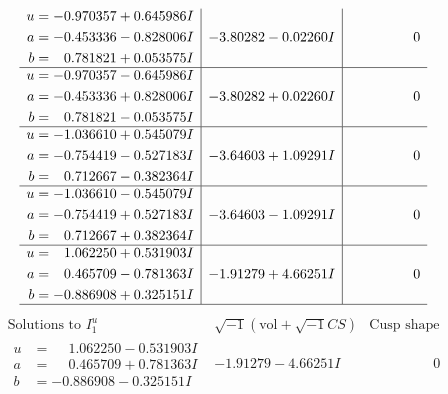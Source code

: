 \documentclass[1p]{elsarticle_modified}
\theoremstyle{definition}
\newcommand{\I}{\sqrt{-1}}
\begin{document}
$$\begin{array}{c|c|c}
\begin{aligned}
u &= -0.970357 + 0.645986 I \\
a &= -0.453336 - 0.828006 I \\
b &= \phantom{-}0.781821 + 0.053575 I\end{aligned}
 & -3.80282 - 0.02260 I & \phantom{-0.000000 } 0 \\ \hline\begin{aligned}
u &= -0.970357 - 0.645986 I \\
a &= -0.453336 + 0.828006 I \\
b &= \phantom{-}0.781821 - 0.053575 I\end{aligned}
 & -3.80282 + 0.02260 I & \phantom{-0.000000 } 0 \\ \hline\begin{aligned}
u &= -1.036610 + 0.545079 I \\
a &= -0.754419 - 0.527183 I \\
b &= \phantom{-}0.712667 - 0.382364 I\end{aligned}
 & -3.64603 + 1.09291 I & \phantom{-0.000000 } 0 \\ \hline\begin{aligned}
u &= -1.036610 - 0.545079 I \\
a &= -0.754419 + 0.527183 I \\
b &= \phantom{-}0.712667 + 0.382364 I\end{aligned}
 & -3.64603 - 1.09291 I & \phantom{-0.000000 } 0 \\ \hline\begin{aligned}
u &= \phantom{-}1.062250 + 0.531903 I \\
a &= \phantom{-}0.465709 - 0.781363 I \\
b &= -0.886908 + 0.325151 I\end{aligned}
 & -1.91279 + 4.66251 I & \phantom{-0.000000 } 0\\
 \hline 
 \end{array}$$\newpage$$\begin{array}{c|c|c}  
\text{Solutions to }I^u_{1}& \I (\text{vol} + \sqrt{-1}CS) & \text{Cusp shape}\\
 \hline 
\begin{aligned}
u &= \phantom{-}1.062250 - 0.531903 I \\
a &= \phantom{-}0.465709 + 0.781363 I \\
b &= -0.886908 - 0.325151 I\end{aligned}
 & -1.91279 - 4.66251 I & \phantom{-0.000000 } 0 \\ \hline\begin{aligned}

\end{aligned}
\end{array}$$
\end{document}

